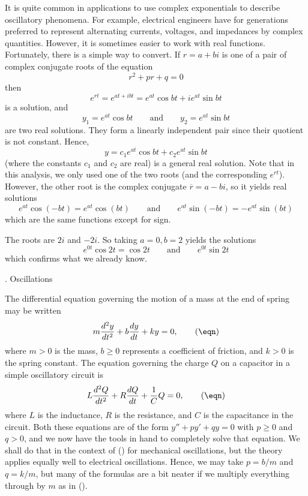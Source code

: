 It is quite common in applications to use complex
exponentials to describe oscillatory phenomena.   For
example, electrical engineers have for generations preferred
to represent
alternating currents, voltages, and impedances by
complex quantities.   However, it is sometimes easier
to work with real functions.  Fortunately, there
is a simple way to convert.   If $r = a + bi$ is
one of a pair of complex conjugate roots of the
equation
$$
r^2 + pr + q = 0
$$
then
$$
e^{rt} = e^{at + ibt} = e^{at}\cos bt + ie^{at}\sin bt
$$
is a solution, and
$$
y_1 = e^{at}\cos bt\qquad\text{and}\qquad y_2 = e^{at}\sin bt
$$
are two real solutions.   They form a linearly independent pair since
their quotient is not constant.  Hence,
$$
y = c_1e^{at}\cos bt + c_2e^{at}\sin bt
$$
(where the constants $c_1$ and $c_2$ are real) is a 
general real solution.   Note that in this analysis, we only used
one of the two roots (and the corresponding $e^{rt}$).
However, the other root is the complex conjugate $\overline r =
a - bi$, so it yields real solutions
$$
e^{at}\cos(-bt) = e^{at}\cos(bt)\qquad\text{and}\qquad e^{at}\sin(-bt)  
= -e^{at}\sin(bt)
$$
which are the same functions except for sign.

  The roots are $2i$ and $-2i$.
So taking $a = 0, b = 2$ yields the solutions
$$
 e^{0t}\cos 2t = \cos 2t\qquad\text{and}\qquad e^{0t}\sin 2t
$$
which confirms what we already know.
\endexample
\bigskip

\bigskip
{}
\head \sn. Oscillations \endhead

The differential equation governing
the motion of a mass at the end of spring may be written
\nexteqn
\xdef\MechEqn{\eqn}
$$
m\frac{d^2y}{dt^2} + b \frac{dy}{dt} + k y = 0,\tag\eqn
$$
where $m > 0$ is the mass, $b \ge 0$ represents a coefficient of friction,
and $k > 0$ is the spring constant.   The equation governing the
%
charge $Q$ on a capacitor in a simple oscillatory circuit is
\nexteqn
\xdef\ElecEqn{\eqn}
$$
L\frac{d^2Q}{dt^2} +  R \frac{dQ}{dt} + \frac 1{C}Q = 0,\tag\eqn
$$
where $L$ is the inductance, $R$ is the resistance, and
$C$ is the capacitance in the circuit.  Both these equations
are of the form $y'' + py' + qy = 0$ with $p \ge 0$
and $q > 0$, and we now have
the tools in hand to completely solve that equation.
We shall do that in the context of (\MechEqn) for mechanical
oscillations, but the theory applies equally well to
electrical oscillations.  Hence, we may take $p = b/m$ and
$q = k/m$, but many of the formulas are a bit neater
if we multiply everything through by $m$ as in (\MechEqn).

